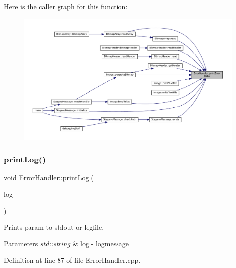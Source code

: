 Here is the caller graph for this function\+:
\nopagebreak
\begin{figure}[H]
\begin{center}
\leavevmode
\includegraphics[width=350pt]{classErrorHandler_ac36e4dd6e488718e7e07b2d03adf9f37_icgraph}
\end{center}
\end{figure}
\mbox{\label{classErrorHandler_adefe2e5f3401006300884dd85a7c88ce}} 
\subsubsection{\texorpdfstring{printLog()}{printLog()}}
{\footnotesize\ttfamily void Error\+Handler\+::print\+Log (\begin{DoxyParamCaption}\item[{std\+::string}]{log }\end{DoxyParamCaption})\hspace{0.3cm}{\ttfamily [static]}}



Prints param to stdout or logfile. 


\begin{DoxyParams}{Parameters}
{\em std\+::string} & log -\/ logmessage \\
\hline
\end{DoxyParams}


Definition at line 87 of file Error\+Handler.\+cpp.

